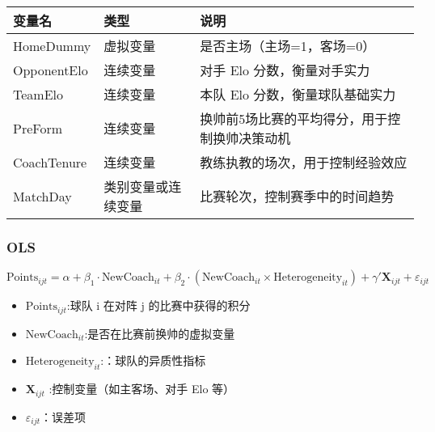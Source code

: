 \documentclass[
]{ctexart}
\providecommand{\tightlist}{%
  \setlength{\itemsep}{0pt}\setlength{\parskip}{0pt}}\usepackage{longtable,booktabs,array}
\begin{document}
\begin{longtable}[]{@{}
  >{\raggedright\arraybackslash}p{}
  >{\raggedright\arraybackslash}p{}
  >{\raggedright\arraybackslash}p{}@{}}
\toprule\noalign{}
\begin{minipage}[b]{\linewidth}\raggedright
变量名
\end{minipage} & \begin{minipage}[b]{\linewidth}\raggedright
类型
\end{minipage} & \begin{minipage}[b]{\linewidth}\raggedright
说明
\end{minipage} \\
\midrule\noalign{}
\endhead
\bottomrule\noalign{}
\endlastfoot
HomeDummy & 虚拟变量 & 是否主场（主场=1，客场=0） \\
OpponentElo & 连续变量 & 对手 Elo 分数，衡量对手实力 \\
TeamElo & 连续变量 & 本队 Elo 分数，衡量球队基础实力 \\
PreForm & 连续变量 & 换帅前5场比赛的平均得分，用于控制换帅决策动机 \\
CoachTenure & 连续变量 & 教练执教的场次，用于控制经验效应 \\
MatchDay & 类别变量或连续变量 & 比赛轮次，控制赛季中的时间趋势 \\
\end{longtable}

\subsubsection{OLS}\label{ols}

\(\text{Points}_{ijt} = \alpha + \beta_1 \cdot \text{NewCoach}_{it} + \beta_2 \cdot (\text{NewCoach}_{it} \times \text{Heterogeneity}_{it}) + \gamma' \mathbf{X}_{ijt} + \varepsilon_{ijt}\)

\begin{itemize}
\tightlist
\item
  \(\text{Points}_{ijt}\):球队 i 在对阵 j 的比赛中获得的积分
\item
  \(\text{NewCoach}_{it}\):是否在比赛前换帅的虚拟变量
\item
  \(\text{Heterogeneity}_{it}\):：球队的异质性指标
\item
  \(\mathbf{X}_{ijt}\) :控制变量（如主客场、对手 Elo 等）
\item
  \(\varepsilon_{ijt}\)：误差项
\end{itemize}
\end{document}
